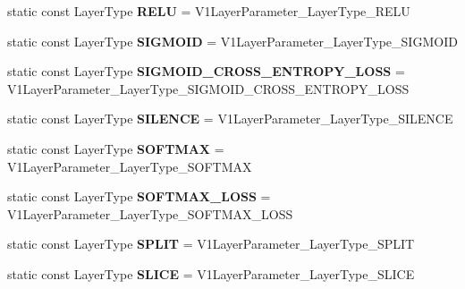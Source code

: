 \begin{DoxyCompactItemize}
static const Layer\+Type {\bfseries R\+E\+LU} = V1\+Layer\+Parameter\+\_\+\+Layer\+Type\+\_\+\+R\+E\+LU
\item 
\mbox{\label{classcaffe_1_1_v1_layer_parameter_a34237acac9a4263d5a3c45382395541a}} 
static const Layer\+Type {\bfseries S\+I\+G\+M\+O\+ID} = V1\+Layer\+Parameter\+\_\+\+Layer\+Type\+\_\+\+S\+I\+G\+M\+O\+ID
\item 
\mbox{\label{classcaffe_1_1_v1_layer_parameter_a98cf521b4f92bf90aa73d9a41f707add}} 
static const Layer\+Type {\bfseries S\+I\+G\+M\+O\+I\+D\+\_\+\+C\+R\+O\+S\+S\+\_\+\+E\+N\+T\+R\+O\+P\+Y\+\_\+\+L\+O\+SS} = V1\+Layer\+Parameter\+\_\+\+Layer\+Type\+\_\+\+S\+I\+G\+M\+O\+I\+D\+\_\+\+C\+R\+O\+S\+S\+\_\+\+E\+N\+T\+R\+O\+P\+Y\+\_\+\+L\+O\+SS
\item 
\mbox{\label{classcaffe_1_1_v1_layer_parameter_a7de23f53d75841b6e35d3e9484ac34bb}} 
static const Layer\+Type {\bfseries S\+I\+L\+E\+N\+CE} = V1\+Layer\+Parameter\+\_\+\+Layer\+Type\+\_\+\+S\+I\+L\+E\+N\+CE
\item 
\mbox{\label{classcaffe_1_1_v1_layer_parameter_a331cb252d9b2541214d970bf981cd466}} 
static const Layer\+Type {\bfseries S\+O\+F\+T\+M\+AX} = V1\+Layer\+Parameter\+\_\+\+Layer\+Type\+\_\+\+S\+O\+F\+T\+M\+AX
\item 
\mbox{\label{classcaffe_1_1_v1_layer_parameter_a0e918681340b39237989640245a7ac30}} 
static const Layer\+Type {\bfseries S\+O\+F\+T\+M\+A\+X\+\_\+\+L\+O\+SS} = V1\+Layer\+Parameter\+\_\+\+Layer\+Type\+\_\+\+S\+O\+F\+T\+M\+A\+X\+\_\+\+L\+O\+SS
\item 
\mbox{\label{classcaffe_1_1_v1_layer_parameter_a10830fbe05dc85de4f44f1750b92370a}} 
static const Layer\+Type {\bfseries S\+P\+L\+IT} = V1\+Layer\+Parameter\+\_\+\+Layer\+Type\+\_\+\+S\+P\+L\+IT
\item 
\mbox{\label{classcaffe_1_1_v1_layer_parameter_a011749655e2d88ac13fce6387d37177e}} 
static const Layer\+Type {\bfseries S\+L\+I\+CE} = V1\+Layer\+Parameter\+\_\+\+Layer\+Type\+\_\+\+S\+L\+I\+CE
\item 

\end{DoxyCompactItemize}

